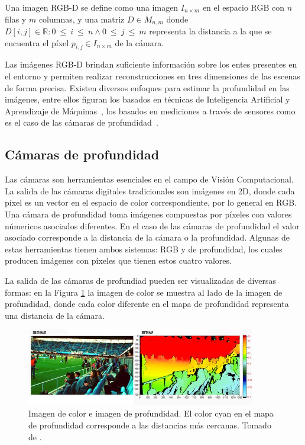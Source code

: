 \begin{definition}
	Una imagen RGB-D se define como una imagen $I_{n \times m}$ en el espacio RGB con $n$ filas y $m$ columnas, y una matriz $D \in M_{n, m}$ donde $D[i, j] \in \mathbb{R}: 0~\leq~i~\leq~n \wedge 0~\leq~j~\leq~m$ representa la distancia a la que se encuentra el píxel $p_{i,j} \in I_{n \times m}$ de la cámara.
\end{definition}

Las imágenes RGB-D brindan suficiente información sobre los entes presentes en el entorno y permiten realizar reconstrucciones en tres dimensiones de las escenas de forma precisa. Existen diversos enfoques para estimar la profundidad en las imágenes, entre ellos figuran los basados en técnicas de Inteligencia Artificial y Aprendizaje de Máquinas~\cite{fu2018deep, hu2019revisiting}, los basados en mediciones a través de sensores como es el caso de las cámaras de profundidad~\cite{intel}.

\subsection{Cámaras de profundidad}

Las cámaras son herramientas esenciales en el campo de Visión Computacional. La salida de las cámaras digitales tradicionales son imágenes en 2D, donde cada píxel es un vector en el espacio de color correspondiente, por lo general en RGB. Una cámara de profundidad toma imágenes compuestas por píxeles con valores númericos asociados diferentes. En el caso de las cámaras de profundidad el valor asociado corresponde a la distancia de la cámara o la profundidad. Algunas de estas herramientas tienen ambos sistemas: RGB y de profundidad, los cuales producen imágenes con píxeles que tienen estos cuatro valores.

La salida de las cámaras de profundiad pueden ser visualizadas de diversas formas: en la Figura \ref{fig:rgbd} la imagen de color se muestra al lado de la imagen de profundidad, donde cada color diferente en el mapa de profundidad representa una distancia de la cámara.

\begin{figure}[ht]
	\centering
	\includegraphics[width=10cm]{./Graphics/rgbd.png}
	\caption{Imagen de color e imagen de profundidad. El color cyan en el mapa de profundidad corresponde a las distancias más cercanas. Tomado de \cite{intel}.}
	\label{fig:rgbd}
\end{figure}

